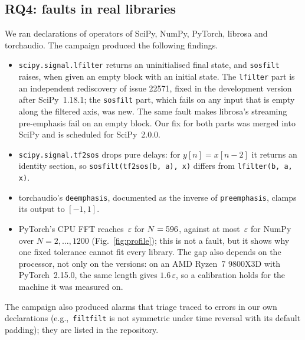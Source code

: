 \documentclass[10pt,conference]{IEEEtran}
\newcommand{\eps}{\varepsilon}
\newcommand{\code}[1]{\texttt{#1}}
\newcommand{\eg}{e.g.,\ }
\begin{document}
\subsection{RQ4: faults in real libraries}
\label{sec:rq4}
We ran declarations of \campaignTargets{} operators of SciPy, NumPy, PyTorch,
librosa and torchaudio. The campaign produced the following findings.
\begin{itemize}
\item \code{scipy.signal.lfilter} returns an uninitialised final state, and
\code{sosfilt} raises, when given an empty block with an initial state. The
\code{lfilter} part is an independent rediscovery of issue 22571, fixed in the
development version after SciPy~1.18.1; the \code{sosfilt} part, which fails on
any input that is empty along the filtered axis, was new. The same fault makes
librosa's streaming pre-emphasis fail on an empty block. Our fix for both parts
was merged into SciPy and is scheduled for SciPy~2.0.0.
\item \code{scipy.signal.tf2sos} drops pure delays: for $y[n]=x[n-2]$ it
returns an identity section, so \code{sosfilt(tf2sos(b, a), x)} differs from
\code{lfilter(b, a, x)}.
\item torchaudio's \code{deemphasis}, documented as the inverse of
\code{preemphasis}, clamps its output to $[-1,1]$.
\item PyTorch's CPU FFT reaches \torchMaxEps$\,\eps$ for $N=596$, against at most
\numpyMaxEps$\,\eps$ for NumPy over $N=2,\dots,1200$
(Fig.~\ref{fig:profile}); this is not a fault, but it shows why one fixed
tolerance cannot fit every library. The gap also depends on the processor, not
only on the versions: on an AMD Ryzen~7 9800X3D with PyTorch~2.15.0, the same
length gives $1.6\,\eps$, so a calibration holds for the machine it was
measured on.
\end{itemize}
The campaign also produced \campaignTriaged{} alarms that triage traced to
errors in our own declarations (\eg \code{filtfilt} is not symmetric under time
reversal with its default padding); they are listed in the repository.
\end{document}
